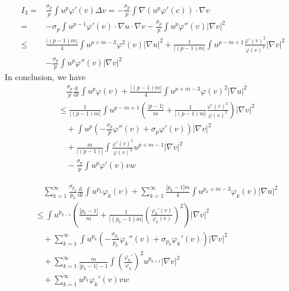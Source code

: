 \documentclass[12pt,]{article}
\begin{document}
\begin{equation}
  \begin{aligned}
    I_3=&\frac{\sigma_{p}}{p}\int u^p\varphi'(v)\Delta v = -\frac{\sigma_{p}}{p}\int \nabla(u^p\varphi'(c))\cdot\nabla v\\
    =&-\sigma_{p}\int u^{p-1}\varphi'(v)\cdot \nabla u\cdot\nabla v -\frac{\sigma_{p}}{p} \int u^p\varphi''(v)|\nabla v|^2\\
    \leqslant & \frac{|(p-1)m|}{4}\int u^{p+m-3}\varphi^2(v)|\nabla u |^{2}+\frac{1}{|(p-1)m|}\int u^{p-m+1}\frac{\varphi'(v)^2}{\varphi(v)^2}|\nabla v|^2\\
    &-\frac{\sigma_{p}}{p} \int u^p\varphi''(v)|\nabla v|^2
  \end{aligned}
\end{equation}
In conclusion, we have
\begin{equation}
  \begin{aligned}
    &\quad\frac{\sigma_{p}}{p}\frac{\mathrm{d}}{\mathrm{d} t} \int u^{p} \varphi(v) +  \frac{|(p-1)m|}{4}\int u^{p+m-3}\varphi(v)^2|\nabla u| ^2 \\
    &\leqslant \frac{1}{|(p-1)m|}\int u^{p-m+1}\left(\frac{|p-1|}{m}+\frac{1}{|(p-1)m|}\frac{\varphi'(v)^2}{\varphi(v)^2}\right)|\nabla v|^2\\
    &\quad + \int u^p\left(-\frac{\sigma_{p}}{p}\varphi''(v)+\sigma_{p}\varphi'(v)\right)|\nabla v|^2\\
    &\quad +\frac{m}{|(p-1)|}\int \frac{\varphi'(v)^2}{\varphi(v)^2}u^{p+m-1}|\nabla v|^2\\
    &\quad - \frac{\sigma_{p}}{p}\int u^p\varphi'(v)vw
  \end{aligned}
\end{equation}

\begin{equation}
  \begin{aligned}
    &\quad\sum_{k=1}^{\infty}\frac{\sigma_{p_k}}{p_k}\frac{\mathrm{d}}{\mathrm{d}t}\int u^{p_k}\varphi_k(v) + \sum_{k=1}^{\infty}\frac{|p_k-1|m}{4}\int u^{p_k+m-3}\varphi_k(v)|\nabla u|^2\\
    &\leqslant \int u^{p_{k-1}}\left(\frac{|p_k-1|}{m}+\frac{1}{|(p_k-1)m|}\left(\frac{\varphi_k'(v)}{\varphi_k(v)}\right)^{2}\right)|\nabla v|^{2}\\
    &\quad + \sum_{k=1}^{\infty}\int u^{p_{k}}\left(-\frac{\sigma_{p_k}}{p_k}\varphi_k''(v)+\sigma_{p_k}\varphi_{k}'(v)\right)|\nabla v|^2\\
    &\quad + \sum_{k=1}^{\infty}\frac{m}{|p_k-1|-1}\int\left(\frac{\varphi_k'}{\varphi_{k}}\right)^2u^{p_{k+1}}|\nabla v|^2\\
    &\quad + \sum_{k=1}^{\infty}u^{p_k}\varphi_k'(v)vw
  \end{aligned}
\end{equation}


% 

\end{document}
